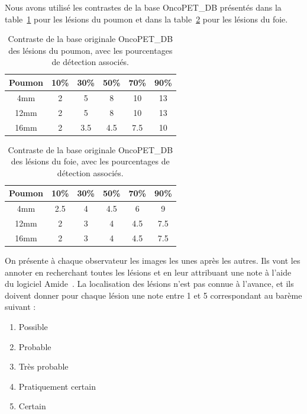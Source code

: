 Nous avons utilisé les contrastes de la base OncoPET\_DB présentés dans la table~\ref{tab:contrastePoumonOrig} pour les lésions du poumon et dans la table~\ref{tab:contrasteFoieOrig} pour les lésions du foie.

\begin{table}
\centering
\begin{tabular}{|c||c|c|c|c|c|}
 \hline
Poumon	& 10\% & 30\% & 50\% & 70\% & 90\% \\
\hline
4mm	& 2    &  5   &  8   & 10   & 13   \\
\hline
12mm    & 2    &  5   &  8   & 10   & 13   \\
\hline
16mm    & 2    &  3.5 &  4.5 & 7.5  & 10   \\
\hline
\end{tabular}
\caption[Contraste de la base originale OncoPET\_DB des lésions du poumon pour létude de détectabilité]{Contraste de la base originale OncoPET\_DB des lésions du poumon, avec les pourcentages de détection associés.}
\label{tab:contrastePoumonOrig}
\end{table}

\begin{table}
\centering
\begin{tabular}{|c||c|c|c|c|c|}
 \hline
Poumon	& 10\% & 30\% & 50\% & 70\% & 90\% \\
\hline
4mm	& 2.5    &  4   &  4.5   & 6   & 9   \\
\hline
12mm    & 2    &  3   &  4   & 4.5   & 7.5   \\
\hline
16mm    & 2    &  3   &  4   & 4.5   & 7.5   \\
\hline
\end{tabular}
\caption[Contraste de la base originale OncoPET\_DB des lésions du foie pour létude de détectabilité]{Contraste de la base originale OncoPET\_DB des lésions du foie, avec les pourcentages de détection associés.}
\label{tab:contrasteFoieOrig}
\end{table}

On présente à chaque observateur les images les unes après les autres. Ils vont les annoter en recherchant toutes les lésions et en leur attribuant une note à l'aide du logiciel Amide~\cite{loening2003amide}. La localisation des lésions n'est pas connue à l'avance, et ils doivent donner pour chaque lésion une note entre 1 et 5 correspondant au barème suivant :

\begin{enumerate}
\item Possible
\item Probable
\item Très probable
\item Pratiquement  certain
\item Certain
\end{enumerate}

